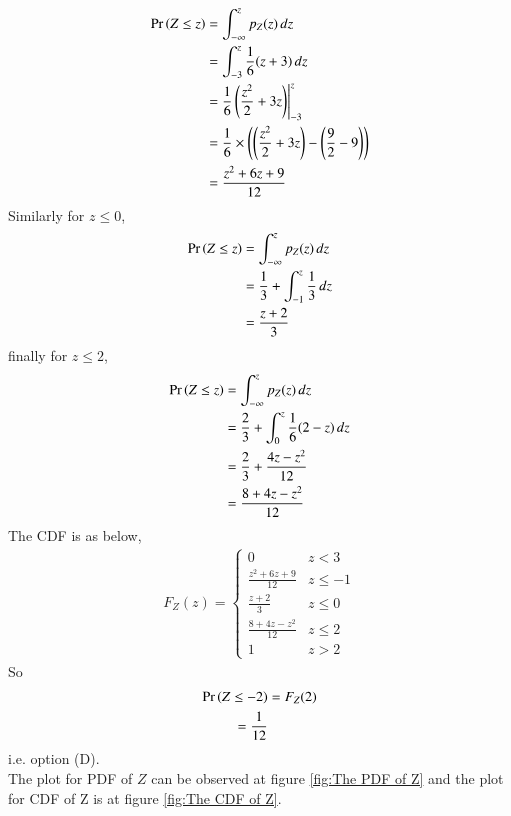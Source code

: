 \begin{align}
    \Pr\left(Z\le z\right) &=  \int_{-\infty}^{z}p_{Z}(z) \,dz  \\
          &=  \int_{-3}^{z} \dfrac{1}{6}(z+3) \,dz  \\
          &= \dfrac{1}{6} \left(\dfrac{z^2}{2}+3z \right) \Biggr|_{-3}^{z}  \\
          &=  \dfrac{1}{6} \times \left(\left(\dfrac{z^2}{2}+3z \right) - \left(\dfrac{9}{2} -9 \right)\right) \\
          &= \dfrac{z^2+6z + 9}{12} 
\end{align}
Similarly for $z \le 0$,
\begin{align}
    \Pr\left(Z\le z\right) &=  \int_{-\infty}^{z}p_{Z}(z) \,dz  \\
          &=  \dfrac{1}{3} + \int_{-1}^{z} \dfrac{1}{3} \,dz  \\
          &= \dfrac{z+2}{3} 
\end{align}
finally for $z \le 2$,
\begin{align}
    \Pr\left(Z\le z\right) &=  \int_{-\infty}^{z}p_{Z}(z) \,dz  \\
          &= \dfrac{2}{3} + \int_{0}^{z} \dfrac{1}{6}(2-z) \,dz  \\
         & =  \dfrac{2}{3} +\dfrac{4z- z^2}{12} \\
         & = \dfrac{8 +4z -z^2}{12} 
\end{align}
The CDF is as below, 
\begin{align}
\label{eq:cdf_z}
F_{Z}(z)  = 
\begin{cases}
0 & z < 3
\\
\frac{z^2+6z + 9}{12} &  z \le -1
\\
\frac{z+2}{3} &  z \le 0
\\
\frac{8 +4z -z^2}{12} & z \le 2
\\
1 & z > 2
\end{cases}
\end{align}
So 
\begin{align}
    \Pr\left( Z \leq -2\right) &= F_{Z}(2) \\
                  = \dfrac{1}{12}
\end{align}
i.e. option (D). \\
The plot for PDF of $Z $ can be observed at figure \ref{fig:The PDF of Z} and the plot for CDF of Z is at figure \ref{fig:The CDF of Z}.
